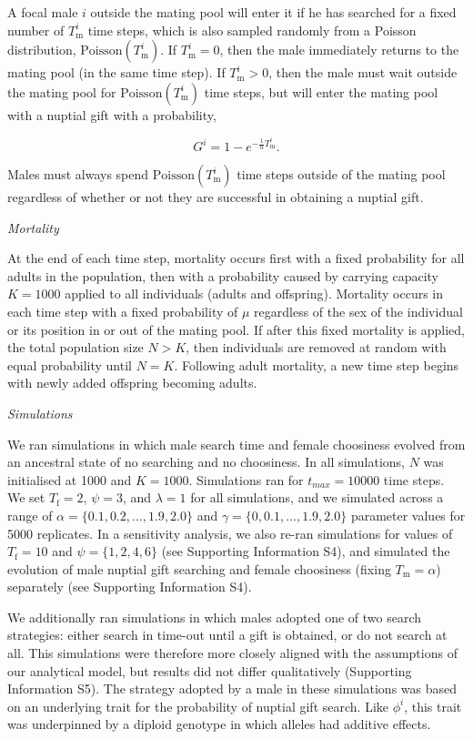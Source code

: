 \documentclass[
]{article}
\begin{document}
A focal male \(i\) outside the mating pool will enter it if he has
searched for a fixed number of \(T^{i}_{\mathrm{m}}\) time steps, which
is also sampled randomly from a Poisson distribution,
\(\mathrm{Poisson}(T^{i}_{\mathrm{m}})\). If \(T^{i}_{\mathrm{m}} = 0\),
then the male immediately returns to the mating pool (in the same time
step). If \(T^{i}_{\mathrm{m}} > 0\), then the male must wait outside
the mating pool for \(\mathrm{Poisson}(T^{i}_{\mathrm{m}})\) time steps,
but will enter the mating pool with a nuptial gift with a probability,

\[G^{i} = 1 - e^{-\frac{1}{\alpha}T^{i}_{\mathrm{m}}}.\]

Males must always spend \(\mathrm{Poisson}(T^{i}_{\mathrm{m}})\) time
steps outside of the mating pool regardless of whether or not they are
successful in obtaining a nuptial gift.

\emph{Mortality}

At the end of each time step, mortality occurs first with a fixed
probability for all adults in the population, then with a probability
caused by carrying capacity \(K = 1000\) applied to all individuals
(adults and offspring). Mortality occurs in each time step with a fixed
probability of \(\mu\) regardless of the sex of the individual or its
position in or out of the mating pool. If after this fixed mortality is
applied, the total population size \(N > K\), then individuals are
removed at random with equal probability until \(N = K\). Following
adult mortality, a new time step begins with newly added offspring
becoming adults.

\emph{Simulations}

We ran simulations in which male search time and female choosiness
evolved from an ancestral state of no searching and no choosiness. In
all simulations, \(N\) was initialised at 1000 and \(K = 1000\).
Simulations ran for \(t_{max} = 10000\) time steps. We set
\(T_{\mathrm{f}} = 2\), \(\psi = 3\), and \(\lambda = 1\) for all
simulations, and we simulated across a range of
\(\alpha = \{0.1, 0.2, ..., 1.9, 2.0\}\) and
\(\gamma = \{0, 0.1, ..., 1.9, 2.0\}\) parameter values for 5000
replicates. In a sensitivity analysis, we also re-ran simulations for
values of \(T_{\mathrm{f}} = 10\) and \(\psi = \{1, 2, 4, 6 \}\) (see
Supporting Information S4), and simulated the evolution of male nuptial
gift searching and female choosiness (fixing
\(T_{\mathrm{m}} = \alpha\)) separately (see Supporting Information S4).

We additionally ran simulations in which males adopted one of two search
strategies: either search in time-out until a gift is obtained, or do
not search at all. This simulations were therefore more closely aligned
with the assumptions of our analytical model, but results did not differ
qualitatively (Supporting Information S5). The strategy adopted by a
male in these simulations was based on an underlying trait for the
probability of nuptial gift search. Like \(\phi^{i}\), this trait was
underpinned by a diploid genotype in which alleles had additive effects.
\end{document}
